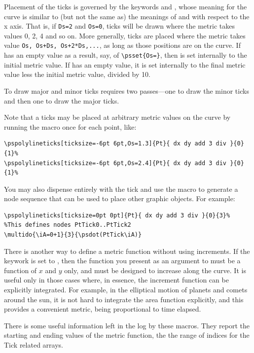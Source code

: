 \documentclass[11pt,english,BCOR=10mm,DIV=12,bibliography=totoc,parskip=false,headings=small,
    headinclude=false,footinclude=false,oneside]{pst-doc}
\begin{document}
Placement of the ticks is governed by the keywords  and , whose meaning for the 
curve is similar to (but not the same as) the meanings of  and  with respect to the x axis. 
That is, if \texttt{Ds=2} and \texttt{Os=0}, ticks will be drawn where the metric takes 
values 0, 2, 4 and so on. More generally, ticks are placed where the metric takes 
value \texttt{Os, Os+Ds, Os+2*Ds,...}, as long as those positions are on the curve. If  
has an empty value as a result, say, of \verb|\psset{Os=}|, then  is set internally 
to the initial metric value. If  has an empty value, it is set internally to the 
final metric value less the initial metric value, divided by 10. 

To draw major and minor ticks requires two passes---one to draw the minor ticks and then one to draw the major ticks.

Note that a ticks may be placed at arbitrary metric values on the curve by running the macro once for each point, like:
\begin{verbatim}
\pspolylineticks[ticksize=-6pt 6pt,Os=1.3]{Pt}{ dx dy add 3 div }{0}{1}%
\pspolylineticks[ticksize=-6pt 6pt,Os=2.4]{Pt}{ dx dy add 3 div }{0}{1}%
\end{verbatim}

You may also dispense entirely with the tick and use the macro to generate a node sequence 
that can be used to place other graphic objects. For example:
\begin{verbatim}
\pspolylineticks[ticksize=0pt 0pt]{Pt}{ dx dy add 3 div }{0}{3}%
%This defines nodes PtTick0..PtTick2
\multido{\iA=0+1}{3}{\psdot(PtTick\iA)}
\end{verbatim}


There is another way to define a metric function without using increments. If the keywork  is set to \true, 
then the function you present as an argument to  must be a function of 
$x$ and $y$ only, and must be designed to increase along the curve. It is useful only in 
those cases where, in essence, the increment function can be explicitly integrated. 
For example, in the elliptical motion of planets and comets around the sun, it is not hard 
to integrate the area function explicitly, and this provides a convenient metric, being proportional to time elapsed.

There is some useful information left in the log by these macros. 
They report the starting and ending values of the metric function, 
the the range of indices for the Tick related arrays.
\end{document}
